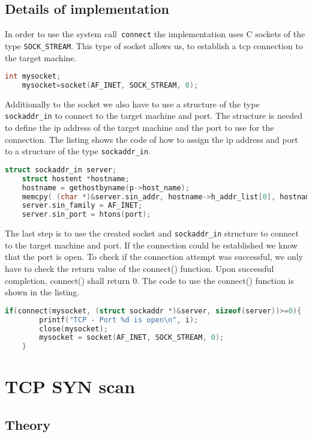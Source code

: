 \documentclass[a4paper]{scrartcl}
\begin{document}
	\subsection{Details of implementation}
	In order to use the system call~\lstinline{connect} the implementation uses C sockets of the type \lstinline|SOCK_STREAM|. This type
	of socket allows us, to establish a tcp connection to the target machine.
	\begin{lstlisting}[frame= single, language=C, caption=C code to create a tcp socket in C]
	int mysocket;
	mysocket=socket(AF_INET, SOCK_STREAM, 0);
	\end{lstlisting}
	Additionally to the socket we also have to use a structure of the type \lstinline|sockaddr_in| to connect to the target machine and port.
	The structure is needed to define the ip address of the target machine and the port to use for the connection. The listing shows the
	code of how to assign the ip address and port to a structure of the type \lstinline|sockaddr_in|. 
	\begin{lstlisting}[frame= single, language=C, caption= C code to use the structure \lstinline|sockaddr_in|]
	struct sockaddr_in server;
	struct hostent *hostname;
	hostname = gethostbyname(p->host_name);
	memcpy( (char *)&server.sin_addr, hostname->h_addr_list[0], hostname->h_length);
	server.sin_family = AF_INET;
	server.sin_port = htons(port);
	\end{lstlisting}
	The last step is to use the created socket and  \lstinline|sockaddr_in| structure to connect to the target machine and port. If the 
	connection could be established we know that the port is open. To check if the connection attempt was successful, we only have to
	check the return value of the connect() function. Upon successful completion, connect() shall return 0. The code to use the connect() function is shown in the listing.
	\begin{lstlisting}[frame= single, language=C, caption= C code to use the connect() to check if port is open]
	if(connect(mysocket, (struct sockaddr *)&server, sizeof(server))>=0){
		printf("TCP - Port %d is open\n", i);
		close(mysocket);
		mysocket = socket(AF_INET, SOCK_STREAM, 0);
	}
	\end{lstlisting}
	
	\section{TCP SYN scan}
	\subsection{Theory}
\end{document}
